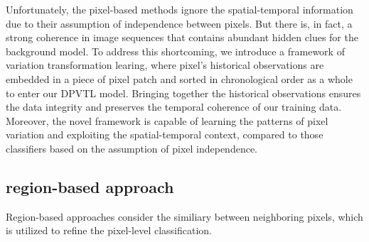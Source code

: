 \documentclass[journal]{IEEEtran}
\begin{document}
Unfortunately,
the pixel-based methods ignore the spatial-temporal information due to their assumption of independence between pixels.
But there is, in fact, a strong coherence in image sequences that contains abundant hidden clues for the background model. 
%
To address this shortcoming, we introduce a framework of variation transformation learing, where pixel's historical observations are embedded in a piece of pixel patch and sorted in chronological order as a whole to enter our DPVTL model.
Bringing together the historical observations ensures the data integrity and preserves the temporal coherence of our training data. 
Moreover, 
the novel framework is capable of learning the patterns of pixel variation and exploiting the spatial-temporal context, compared to those classifiers based on the assumption of pixel independence. 
%
%
%
%
%
%
\subsection{region-based approach}
Region-based approaches consider the similiary between neighboring pixels, which is utilized to refine the pixel-level classification.
%
\end{document}
